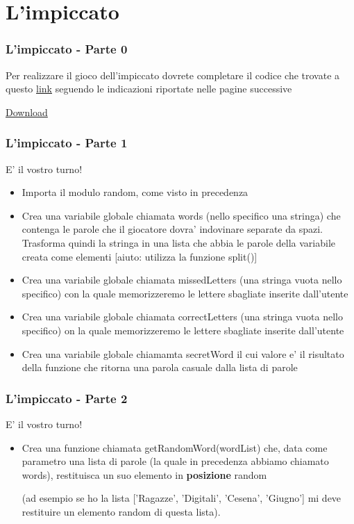 
\section{L'impiccato}

\begin{frame}
	\frametitle{L'impiccato - Parte 0}
	    Per realizzare il gioco dell'impiccato dovrete completare il codice che trovate a questo
	    \href{https://raw.githubusercontent.com/ragazzedigitalicesena/slide-2019/master/tex/chapter_5-8/hangman.py}{link} seguendo le indicazioni riportate nelle pagine successive

	    \vspace{5mm}
	    \href{https://raw.githubusercontent.com/ragazzedigitalicesena/slide-2019/master/tex/chapter_5-8/hangman.py}{Download}
\end{frame}

\begin{frame}[fragile]
	\frametitle{L'impiccato - Parte 1}

	\begin{block}{E' il vostro turno!}

		\begin{itemize}
			\item Importa il modulo random, come visto in precedenza
			\item Crea una variabile globale chiamata words (nello specifico una stringa) che contenga le parole che il giocatore dovra' indovinare separate da spazi. Trasforma quindi la stringa in una lista che abbia le parole della variabile creata come elementi [aiuto: utilizza la funzione split()]
			\item Crea una variabile globale chiamata missedLetters (una stringa vuota nello specifico) con la quale memorizzeremo le lettere sbagliate inserite dall'utente
			\item Crea una variabile globale chiamata correctLetters (una stringa vuota nello specifico) on la quale memorizzeremo le lettere sbagliate inserite dall'utente
			\item Crea una variabile globale chiamamta secretWord il cui valore e' il risultato della funzione che ritorna una parola casuale dalla lista di parole
		\end{itemize}
	\end{block}
\end{frame}

\begin{frame}[fragile]
	\frametitle{L'impiccato - Parte 2}

	\begin{block}{E' il vostro turno!}

		\begin{itemize}
			\item Crea una funzione chiamata getRandomWord(wordList) che, data come parametro una lista di parole (la quale in precedenza abbiamo chiamato words), restituisca un suo elemento in \textbf{posizione} random

				(ad esempio se ho la lista ['Ragazze', 'Digitali', 'Cesena', 'Giugno'] mi deve restituire un elemento random di questa lista).
		\end{itemize}
	\end{block}
\end{frame}

